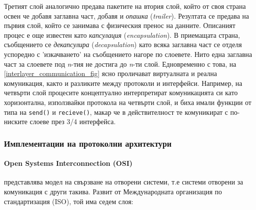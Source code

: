 \documentclass[12pt,a4paper,oneside]{book}
\begin{document}
Третият слой аналогично предава пакетите на втория слой, който от своя страна
освен че добавя заглавна част, добавя и \textit{опашка} (\textit{trailer}). Резултата
се предава на първия слой, който се занимава с физическия пренос на данните.
Описаният процес е още известен като \textit{капсулация} (\textit{encapsulation}). В
приемащата страна, съобщението се \textit{декапсулира} (\textit{decapsulation}) като
всяка заглавна част се отделя успоредно с 'изкачването' на съобщението нагоре по
слоевете. Нито една заглавна част за слоевете под \textit{n}-тия не достига до
\textit{n}-ти слой. Едновременно с това, на
\autoref{interlayer_communication_fig} ясно проличават виртуалната и реална
комуникация, както и разликите между протоколи и интерфейси. Например, на
четвърти слой процесите концептуално интерпретират комуникацията си като
хоризонтална, използвайки протокола на четвърти слой, и биха имали функции от типа
на \texttt{send()} и \texttt{recieve()}, макар че в действителност те
комуникират с по-ниските слоеве през 3/4 интерфейса.

\subsubsection{Имплементации на протоколни архитектури}

\paragraph{Open Systems Interconnection (OSI)} представлява модел на свързване
на отворени системи, т.е системи отворени за комуникация с други такива.
Развит от Международната организация по стандартизация (ISO), той
има седем слоя:
\end{document}

